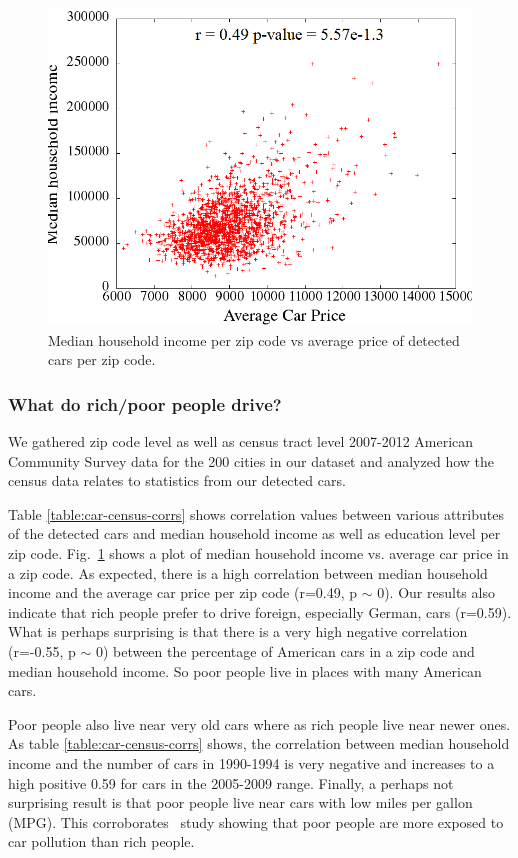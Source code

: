 \documentclass[10pt,twocolumn,letterpaper]{article}
\begin{document}
\begin{figure}[t]
\begin{center}
   \includegraphics[width=0.9\linewidth]{img/averagePriceIncome.png}
\end{center}
   \caption {Median household income per zip code vs average price of detected cars per zip code.}
\label{fig:price-income-corr}
\end{figure}

\subsubsection{What do rich/poor people drive?}
We gathered zip code level as well as census tract level 2007-2012 American Community Survey data for the 200 cities in our dataset and analyzed how the census data relates to statistics from our detected cars. 

Table \ref{table:car-census-corrs} shows correlation values between various attributes of the detected cars and median household income as well as education level per zip code. Fig.~\ref{fig:price-income-corr} shows a plot of median household income vs. average car price in a zip code. As expected, there is a high correlation between median household income and the average car price per zip code (r=0.49, p \(\sim\) 0). Our results also indicate that rich people prefer to drive foreign, especially German, cars (r=0.59). What is perhaps surprising is that there is a very high negative correlation (r=-0.55, p \(\sim\) 0) between the percentage of American cars in a zip code and median household income. So poor people live in places with many American cars.

Poor people also live near very old cars where as rich people live near newer ones. As table \ref{table:car-census-corrs} shows, the correlation between median household income and the number of cars in 1990-1994 is very negative and increases to a high positive 0.59 for cars in the 2005-2009 range. Finally, a perhaps not surprising result is that poor people live near cars with low miles per gallon (MPG). This corroborates~\cite{cal-traffic-study} study showing that poor people are more exposed to car pollution than rich people.
 
\end{document}

